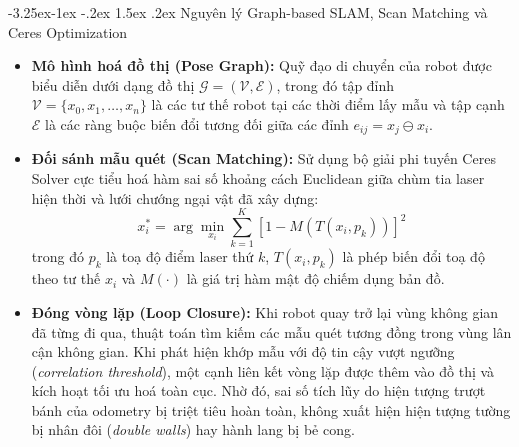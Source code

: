 \documentclass[11pt,a4paper]{article}
\makeatletter
\renewcommand{\subsection}{\@startsection{subsection}{2}{\z@}%
  {-3.25ex\@plus -1ex \@minus -.2ex}%
  {1.5ex \@plus .2ex}%
  {\normalfont\large\bfseries\color{secondary}}}
\makeatother
\begin{document}
\subsection{Nguyên lý Graph-based SLAM, Scan Matching và Ceres Optimization}
\begin{itemize}
  \item \textbf{Mô hình hoá đồ thị (Pose Graph):} Quỹ đạo di chuyển của robot được biểu diễn dưới dạng đồ thị $\mathcal{G} = (\mathcal{V}, \mathcal{E})$, trong đó tập đỉnh $\mathcal{V} = \{x_0, x_1, \dots, x_n\}$ là các tư thế robot tại các thời điểm lấy mẫu và tập cạnh $\mathcal{E}$ là các ràng buộc biến đổi tương đối giữa các đỉnh $e_{ij} = x_j \ominus x_i$.
  \item \textbf{Đối sánh mẫu quét (Scan Matching):} Sử dụng bộ giải phi tuyến Ceres Solver cực tiểu hoá hàm sai số khoảng cách Euclidean giữa chùm tia laser hiện thời và lưới chướng ngại vật đã xây dựng:
  \begin{equation}
    x_i^* = \arg\min_{x_i} \sum_{k=1}^{K} \left[ 1 - M(T(x_i, p_k)) \right]^2
  \end{equation}
  trong đó $p_k$ là toạ độ điểm laser thứ $k$, $T(x_i, p_k)$ là phép biến đổi toạ độ theo tư thế $x_i$ và $M(\cdot)$ là giá trị hàm mật độ chiếm dụng bản đồ.
  \item \textbf{Đóng vòng lặp (Loop Closure):} Khi robot quay trở lại vùng không gian đã từng đi qua, thuật toán tìm kiếm các mẫu quét tương đồng trong vùng lân cận không gian. Khi phát hiện khớp mẫu với độ tin cậy vượt ngưỡng (\textit{correlation threshold}), một cạnh liên kết vòng lặp được thêm vào đồ thị và kích hoạt tối ưu hoá toàn cục. Nhờ đó, sai số tích lũy do hiện tượng trượt bánh của odometry bị triệt tiêu hoàn toàn, không xuất hiện hiện tượng tường bị nhân đôi (\textit{double walls}) hay hành lang bị bẻ cong.
\end{itemize}
\end{document}
